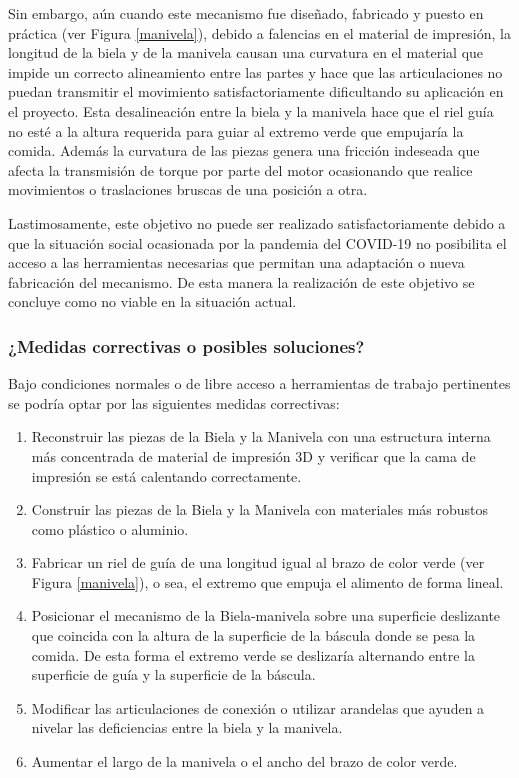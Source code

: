 Sin embargo, aún cuando este mecanismo fue diseñado, fabricado y puesto en práctica (ver Figura \ref{manivela}), debido a falencias en el material de impresión, la longitud de la biela y de la manivela causan una curvatura en el material que impide un correcto alineamiento entre las partes y hace que las articulaciones no puedan transmitir el movimiento satisfactoriamente dificultando su aplicación en el proyecto. Esta desalineación entre la biela y la manivela hace que el riel guía no esté a la altura requerida para guiar al extremo verde que empujaría la comida. Además la curvatura de las piezas genera una fricción indeseada que afecta la transmisión de torque por parte del motor ocasionando que realice movimientos o traslaciones bruscas de una posición a otra.

Lastimosamente, este objetivo no puede ser realizado satisfactoriamente debido a que la situación social ocasionada por la pandemia del COVID-19 no posibilita el acceso a las herramientas necesarias que permitan una adaptación o nueva fabricación del mecanismo. De esta manera la realización de este objetivo se concluye como no viable en la situación actual.

\subsubsection{¿Medidas correctivas o posibles soluciones?}

Bajo condiciones normales o de libre acceso a herramientas de trabajo pertinentes se podría optar por las siguientes medidas correctivas:
\begin{enumerate}
    \item Reconstruir las piezas de la Biela y la Manivela con una estructura interna más concentrada de material de impresión 3D y verificar que la cama de impresión se está calentando correctamente.
    \item Construir las piezas de la Biela y la Manivela con materiales más robustos como plástico o aluminio.
    \item Fabricar un riel de guía de una longitud igual al brazo de color verde (ver Figura \ref{manivela}), o sea, el extremo que empuja el alimento de forma lineal.
    \item Posicionar el mecanismo de la Biela-manivela sobre una superficie deslizante que coincida con la altura de la superficie de la báscula donde se pesa la comida. De esta forma el extremo verde se deslizaría alternando entre la superficie de guía y la superficie de la báscula.
    \item Modificar las articulaciones de conexión o utilizar arandelas que ayuden a nivelar las deficiencias entre la biela y la manivela.
    \item Aumentar el largo de la manivela o el ancho del brazo de color verde.
\end{enumerate}


